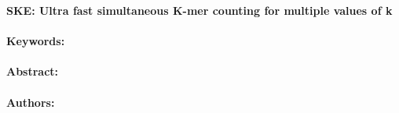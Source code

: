 \noindent
\large {\bf SKE: Ultra fast simultaneous K-mer counting for multiple values of k} 


\normalsize 


\noindent \paragraph{Keywords:} 

\noindent \paragraph{Abstract:} 



\noindent \paragraph{Authors:} 

